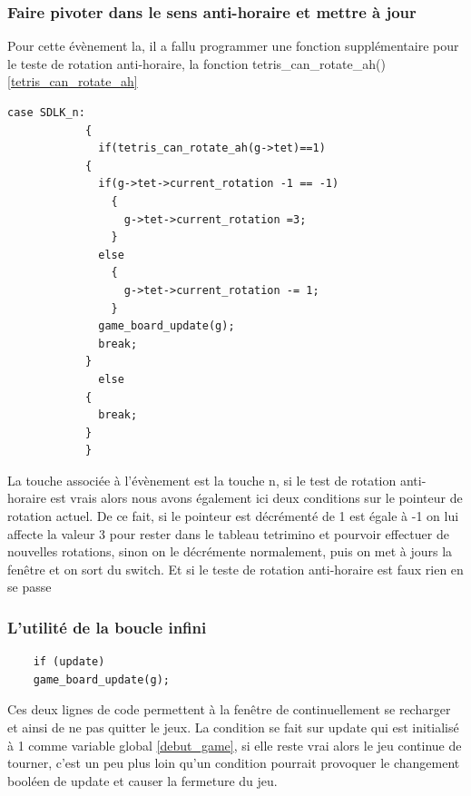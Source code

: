 \documentclass[a4paper,10p]{report}
\begin{document}
\subsubsection{Faire pivoter dans le sens anti-horaire et mettre à jour}
\label{rotate_ah}
Pour cette évènement la, il a fallu programmer une fonction supplémentaire pour le teste de rotation anti-horaire, la fonction tetris\_can\_rotate\_ah() \ref{tetris_can_rotate_ah}
\begin{lstlisting}
case SDLK_n:
		    {
		      if(tetris_can_rotate_ah(g->tet)==1)
			{
			  if(g->tet->current_rotation -1 == -1)
			    {
			      g->tet->current_rotation =3;
			    }
			  else
			    {
			      g->tet->current_rotation -= 1;
			    }
			  game_board_update(g);
			  break;
			}
		      else
			{
			  break;
			}
		    }
\end{lstlisting}
La touche associée à l'évènement est la touche n, si le test de rotation anti-horaire est vrais alors nous avons également ici deux conditions sur le pointeur de rotation actuel. De ce fait, si le pointeur est décrémenté de 1 est égale à -1 on lui affecte la valeur 3 pour rester dans le tableau tetrimino et pourvoir effectuer de nouvelles rotations, sinon on le décrémente normalement, puis on met à jours la fenêtre et on sort du switch. Et si le teste de rotation anti-horaire est faux rien en se passe

\subsubsection{L'utilité de la boucle infini}
\begin{lstlisting}
    if (update)
	game_board_update(g);
\end{lstlisting}
Ces deux lignes de code permettent à la fenêtre de continuellement se recharger et ainsi de ne pas quitter le jeux. La condition se fait sur update qui est initialisé à 1 comme variable global \ref{debut_game}, si elle reste vrai alors le jeu continue de tourner, c'est un peu plus loin qu'un condition pourrait provoquer le changement booléen de update et causer la fermeture du jeu.
\end{document}
